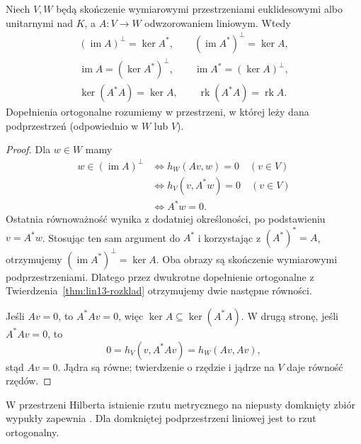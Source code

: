 \begin{twierdzenie}
\label{thm:lin13-kernel-image}
Niech \(V,W\) będą skończenie
wymiarowymi przestrzeniami
euklidesowymi albo unitarnymi
nad \(K\), a \(A\colon V\to W\)
odwzorowaniem liniowym.
Wtedy
\[
 \begin{gathered}
 (\operatorname{im}A)^\perp=\ker A^*,
 \qquad
 (\operatorname{im}A^*)^\perp=\ker A,\\
 \operatorname{im}A=(\ker A^*)^\perp,
 \qquad
 \operatorname{im}A^*=(\ker A)^\perp,\\
 \ker(A^*A)=\ker A,\qquad
 \operatorname{rk}(A^*A)=\operatorname{rk}A.
 \end{gathered}
\]
Dopełnienia ortogonalne rozumiemy
w przestrzeni, w której leży
dana podprzestrzeń (odpowiednio
w \(W\) lub \(V\)).
\end{twierdzenie}
\begin{proof}
Dla \(w\in W\) mamy
\[
 \begin{aligned}
 w\in(\operatorname{im}A)^\perp
 &\Longleftrightarrow
   h_W(Av,w)=0\quad(v\in V)\\
 &\Longleftrightarrow
   h_V(v,A^*w)=0\quad(v\in V)\\
 &\Longleftrightarrow A^*w=0.
 \end{aligned}
\]
Ostatnia równoważność wynika
z dodatniej określoności,
po podstawieniu \(v=A^*w\).
Stosując ten sam argument
do \(A^*\) i korzystając z
\((A^*)^*=A\), otrzymujemy
\((\operatorname{im}A^*)^\perp=\ker A\).
Oba obrazy są skończenie
wymiarowymi podprzestrzeniami.
Dlatego przez dwukrotne
dopełnienie ortogonalne
z
Twierdzenia~\ref{thm:lin13-rozklad}
otrzymujemy dwie następne równości.

Jeśli \(Av=0\), to
\(A^*Av=0\), więc
\(\ker A\subseteq\ker(A^*A)\).
W drugą stronę, jeśli
\(A^*Av=0\), to
\[
 0=h_V(v,A^*Av)=h_W(Av,Av),
\]
stąd \(Av=0\).
Jądra są równe; twierdzenie
o rzędzie i jądrze
na \(V\) daje równość rzędów.
\end{proof}

W przestrzeni Hilberta istnienie rzutu metrycznego na niepusty domknięty zbiór wypukły zapewnia . Dla domkniętej podprzestrzeni liniowej jest to rzut ortogonalny.

